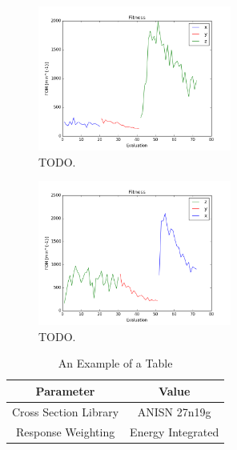 \documentclass[conference]{IEEEtran}
\begin{document}
\begin{figure}[!t]
  \centering
  \includegraphics[width=2.5in]{fitness_xyz}
  \caption{TODO.}
  \label{fig:fitness_xyz}
\end{figure}

\begin{figure}[!t]
  \centering
  \includegraphics[width=2.5in]{fitness_zyx}
  \caption{TODO.}
  \label{fig:fitness_zyx}
\end{figure}

\appendix
\begin{table}[!t]
\caption{An Example of a Table}
\label{tab:results}
\centering
\begin{tabular}{|c|c|} \hline
Parameter & Value \\ \hline
Cross Section Library & ANISN 27n19g \\ \hline
Response Weighting & Energy Integrated  \\ \hline
\end{tabular}
\end{table}


\end{document}
